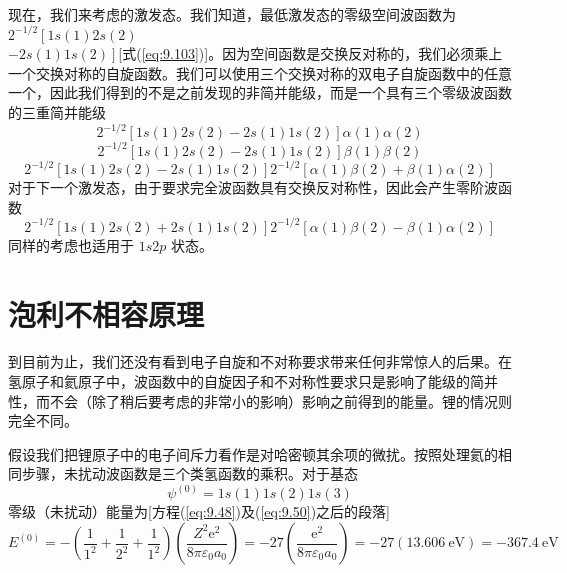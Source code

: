     现在，我们来考虑的激发态。我们知道，最低激发态的零级空间波函数为$2^{-1/2}\left[1s\left(1\right)2s\left(2\right) \right.$\\$\left. - 2s\left(1\right)1s\left(2\right)\right]$[式(\ref{eq:9.103})]。因为空间函数是交换反对称的，我们必须乘上一个交换对称的自旋函数。我们可以使用三个交换对称的双电子自旋函数中的任意一个，因此我们得到的不是之前发现的非简并能级，而是一个具有三个零级波函数的三重简并能级
    \begin{equation}
        2^{-1/2}\left[1s\left(1\right)2s\left(2\right) - 2s\left(1\right)1s\left(2\right)\right]\alpha\left(1\right)\alpha\left(2\right)
        \label{eq:10.27}
    \end{equation}
    \begin{equation}
        2^{-1/2}\left[1s\left(1\right)2s\left(2\right) - 2s\left(1\right)1s\left(2\right)\right]\beta\left(1\right)\beta\left(2\right)
        \label{eq:10.28}
    \end{equation}
    \begin{equation}
        2^{-1/2}\left[1s\left(1\right)2s\left(2\right) - 2s\left(1\right)1s\left(2\right)\right]2^{-1/2}\left[\alpha\left(1\right)\beta\left(2\right) + \beta\left(1\right)\alpha\left(2\right)\right]
        \label{eq:10.29}
    \end{equation}
    对于下一个激发态，由于要求完全波函数具有交换反对称性，因此会产生零阶波函数
    \begin{equation}
        2^{-1/2}\left[1s\left(1\right)2s\left(2\right) + 2s\left(1\right)1s\left(2\right)\right]2^{-1/2}\left[\alpha\left(1\right)\beta\left(2\right) - \beta\left(1\right)\alpha\left(2\right)\right]
        \label{eq:10.30}
    \end{equation}
    同样的考虑也适用于 $1s2p$ 状态。

\section{泡利不相容原理}
\label{sec:10.5 The Pauli Exclusion Principle}

    到目前为止，我们还没有看到电子自旋和不对称要求带来任何非常惊人的后果。在氢原子和氦原子中，波函数中的自旋因子和不对称性要求只是影响了能级的简并性，而不会（除了稍后要考虑的非常小的影响）影响之前得到的能量。锂的情况则完全不同。

    假设我们把锂原子中的电子间斥力看作是对哈密顿其余项的微扰。按照处理氦的相同步骤，未扰动波函数是三个类氢函数的乘积。对于基态
    \begin{equation}
        \psi^{\left(0\right)} = 1s\left(1\right)1s\left(2\right)1s\left(3\right)
        \label{eq:10.31}
    \end{equation}
    零级（未扰动）能量为[方程(\ref{eq:9.48})及(\ref{eq:9.50})之后的段落]
    \begin{equation*}
        E^{\left(0\right)} = -\left(\frac{1}{1^2} + \frac{1}{2^2} + \frac{1}{1^2}\right)\left(\frac{Z^2\mathrm{e}^2}{8\pi \varepsilon_0a_0}\right) = -27 \left(\frac{\mathrm{e}^2}{8\pi \varepsilon_0a_0}\right) = -27  \left(13.606 \: \mathrm{eV}\right) = -367.4 \: \mathrm{eV}
    \end{equation*}

